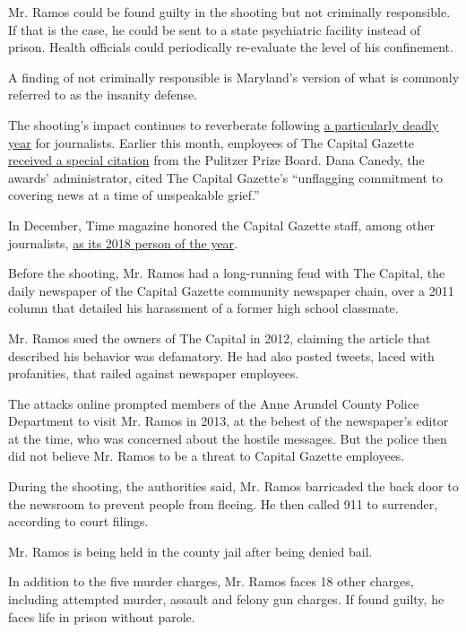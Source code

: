 Mr. Ramos could be found guilty in the shooting but not criminally
responsible. If that is the case, he could be sent to a state
psychiatric facility instead of prison. Health officials could
periodically re-evaluate the level of his confinement.

A finding of not criminally responsible is Maryland's version of what is
commonly referred to as the insanity defense.

The shooting's impact continues to reverberate following
\href{https://www.nytimes3xbfgragh.onion/2018/10/11/world/americas/journalists-killed.html}{a
particularly deadly year} for journalists. Earlier this month, employees
of The Capital Gazette
\href{https://www.nytimes3xbfgragh.onion/2019/04/15/business/media/pulitzer-prizes.html}{received
a special citation} from the Pulitzer Prize Board. Dana Canedy, the
awards' administrator, cited The Capital Gazette's ``unflagging
commitment to covering news at a time of unspeakable grief.''

In December, Time magazine honored the Capital Gazette staff, among
other journalists,
\href{https://www.nytimes3xbfgragh.onion/2018/12/11/business/media/jamal-khashoggi-person-of-the-year-time.html}{as
its 2018 person of the year}.

Before the shooting, Mr. Ramos had a long-running feud with The Capital,
the daily newspaper of the Capital Gazette community newspaper chain,
over a 2011 column that detailed his harassment of a former high school
classmate.

Mr. Ramos sued the owners of The Capital in 2012, claiming the article
that described his behavior was defamatory. He had also posted tweets,
laced with profanities, that railed against newspaper employees.

The attacks online prompted members of the Anne Arundel County Police
Department to visit Mr. Ramos in 2013, at the behest of the newspaper's
editor at the time, who was concerned about the hostile messages. But
the police then did not believe Mr. Ramos to be a threat to Capital
Gazette employees.

During the shooting, the authorities said, Mr. Ramos barricaded the back
door to the newsroom to prevent people from fleeing. He then called 911
to surrender, according to court filings.

Mr. Ramos is being held in the county jail after being denied bail.

In addition to the five murder charges, Mr. Ramos faces 18 other
charges, including attempted murder, assault and felony gun charges. If
found guilty, he faces life in prison without parole.

